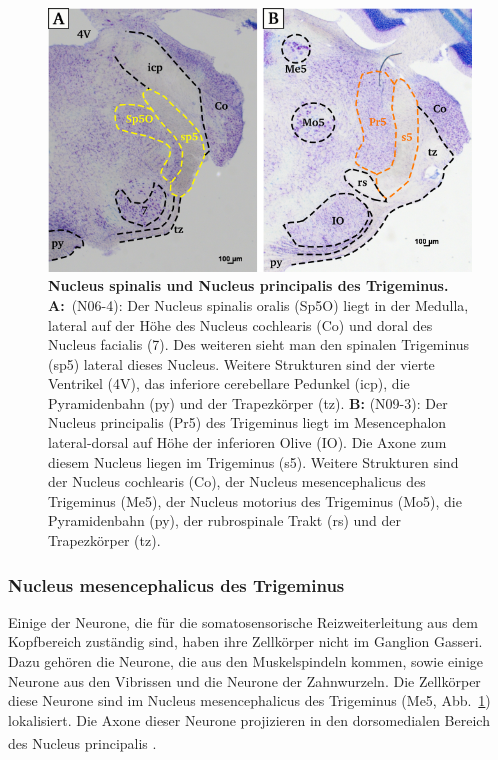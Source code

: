 \begin{figure}[H]
    \centering
    \includegraphics[width = \textwidth]
    {pictures/somatosensory/somato_kopf.png}
    \caption[Nucleus spinalis und Nucleus principalis des Trigeminus]{\textbf{Nucleus spinalis und Nucleus principalis des Trigeminus.}\\
     \textbf{A:}~(N06-4): Der Nucleus spinalis oralis (Sp5O) liegt in der Medulla, lateral auf der Höhe des Nucleus cochlearis (Co) und doral des Nucleus facialis (7). Des weiteren sieht man den spinalen Trigeminus (sp5) lateral dieses Nucleus. Weitere Strukturen sind der vierte Ventrikel (4V), das inferiore cerebellare Pedunkel (icp), die Pyramidenbahn (py) und der Trapezkörper (tz).
     \textbf{B:} (N09-3): Der Nucleus principalis (Pr5) des Trigeminus liegt im Mesencephalon lateral-dorsal auf Höhe der inferioren Olive (IO). Die Axone zum diesem Nucleus liegen im Trigeminus (s5). Weitere Strukturen sind der Nucleus cochlearis (Co), der Nucleus mesencephalicus des Trigeminus (Me5), der Nucleus motorius des Trigeminus (Mo5),  die Pyramidenbahn (py), der rubrospinale Trakt (rs) und der Trapezkörper (tz).}
    \label{fig:somato_Pr5}
\end{figure}

\subsubsection*{Nucleus mesencephalicus des Trigeminus}
Einige der Neurone, die für die somatosensorische Reizweiterleitung aus dem Kopfbereich zuständig sind, haben ihre Zellkörper nicht im Ganglion Gasseri. Dazu gehören die Neurone, die aus den Muskelspindeln kommen, sowie einige Neurone aus den Vibrissen und die Neurone der Zahnwurzeln. Die Zellkörper diese Neurone sind im Nucleus mesencephalicus des Trigeminus (Me5, Abb.~\ref{fig:somato_Pr5}) lokalisiert. Die Axone dieser Neurone projizieren in den dorsomedialen Bereich des Nucleus principalis  \textsuperscript{\cite[Kap.~5]{heldmaier2003tierphysiologie}}.

